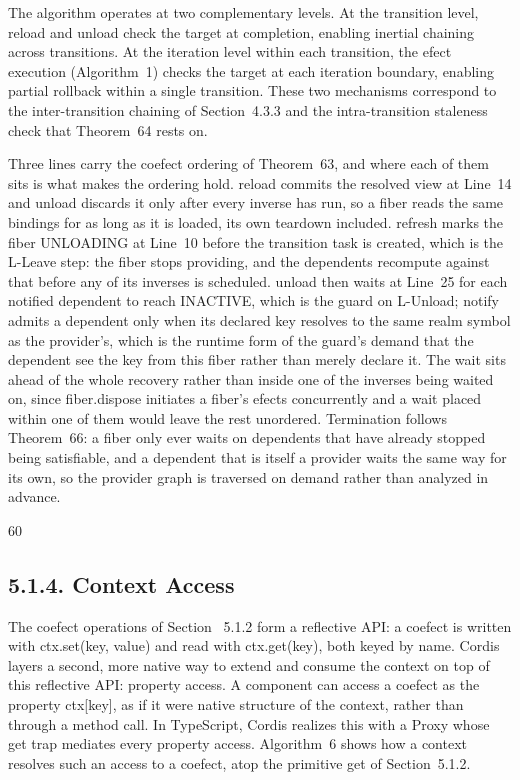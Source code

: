 \documentclass[
  10
]{article}
\begin{document}
The algorithm operates at two complementary levels. At the transition
level, reload and unload check the target at completion, enabling
inertial chaining across transitions. At the iteration level within each
transition, the efect execution (Algorithm~1) checks the target at each
iteration boundary, enabling partial rollback within a single
transition. These two mechanisms correspond to the inter-transition
chaining of Section~4.3.3 and the intra-transition staleness check that
Theorem~64 rests on.

Three lines carry the coefect ordering of Theorem~63, and where each of
them sits is what makes the ordering hold. reload commits the resolved
view at Line~14 and unload discards it only after every inverse has run,
so a fiber reads the same bindings for as long as it is loaded, its own
teardown included. refresh marks the fiber UNLOADING at Line~10 before
the transition task is created, which is the L-Leave step: the fiber
stops providing, and the dependents recompute against that before any of
its inverses is scheduled. unload then waits at Line~25 for each
notified dependent to reach INACTIVE, which is the guard on L-Unload;
notify admits a dependent only when its declared key resolves to the
same realm symbol as the provider's, which is the runtime form of the
guard's demand that the dependent see the key from this fiber rather
than merely declare it. The wait sits ahead of the whole recovery rather
than inside one of the inverses being waited on, since fiber.dispose
initiates a fiber's efects concurrently and a wait placed within one of
them would leave the rest unordered. Termination follows Theorem~66: a
fiber only ever waits on dependents that have already stopped being
satisfiable, and a dependent that is itself a provider waits the same
way for its own, so the provider graph is traversed on demand rather
than analyzed in advance.

60

\subsection{5.1.4. Context Access}\label{context-access}

The coefect operations of Section~ 5.1.2 form a reflective API: a
coefect is written with ctx.set(key, value) and read with ctx.get(key),
both keyed by name. Cordis layers a second, more native way to extend
and consume the context on top of this reflective API: property access.
A component can access a coefect as the property ctx{[}key{]}, as if it
were native structure of the context, rather than through a method call.
In TypeScript, Cordis realizes this with a Proxy whose get trap mediates
every property access. Algorithm~6 shows how a context resolves such an
access to a coefect, atop the primitive get of Section~5.1.2.
\end{document}
